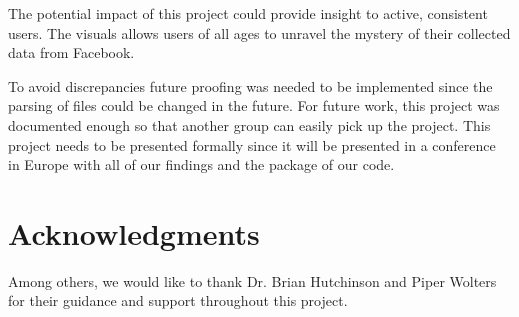 \documentclass[conference, letterpaper, 11pt]{IEEEtran}
\begin{document}
The potential impact of this project could provide insight to active, consistent users. The visuals allows users of all ages to unravel the mystery of their collected data from Facebook.

To avoid discrepancies future proofing was needed to be implemented since the parsing of files could be changed in the future. For future work, this project was documented enough so that another group can easily pick up the project. This project needs to be presented formally since it will be presented in a conference in Europe with all of our findings and the package of our code. 


\section*{Acknowledgments}

Among others, we would like to thank Dr. Brian Hutchinson and Piper Wolters for their guidance and support throughout this project.

\printbibliography
\end{document}
